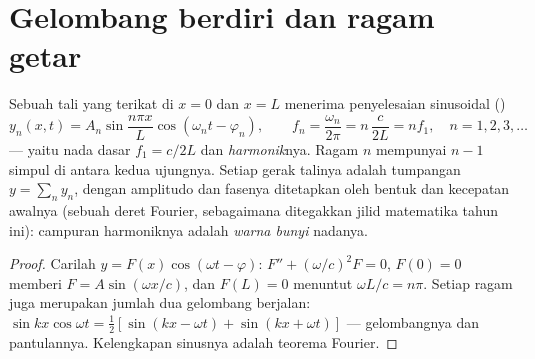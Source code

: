 \section{Gelombang berdiri dan ragam getar}

\begin{proposition}\label{prop:b2:waves-on-strings:modes}
Sebuah tali yang terikat di $x = 0$ dan $x = L$ menerima penyelesaian
 sinusoidal (\emph{})
\[
y_n(x, t) = A_n\sin\frac{n\pi x}{L}\cos(\omega_nt - \varphi_n) , \qquad
f_n = \frac{\omega_n}{2\pi} = n\,\frac{c}{2L} = n f_1 , \quad n = 1, 2, 3, \dots
\]
--- yaitu nada dasar $f_1 = c/2L$ dan \emph{harmonik}nya. Ragam $n$ mempunyai
$n - 1$ simpul di antara kedua ujungnya. Setiap gerak talinya adalah
tumpangan $y = \sum_ny_n$, dengan amplitudo dan fasenya ditetapkan oleh
bentuk dan kecepatan awalnya (sebuah deret Fourier, sebagaimana ditegakkan
jilid matematika tahun ini): campuran harmoniknya adalah
\emph{warna bunyi} nadanya.
\end{proposition}

\begin{proof}
Carilah $y = F(x)\cos(\omega t - \varphi)$: $F'' + (\omega/c)^2F = 0$, $F(0) = 0$ memberi
$F = A\sin(\omega x/c)$, dan $F(L) = 0$ menuntut $\omega L/c = n\pi$. Setiap ragam juga
merupakan jumlah dua gelombang berjalan: $\sin kx\cos\omega t = \tfrac12[\sin(kx -
\omega t) + \sin(kx + \omega t)]$ --- gelombangnya dan pantulannya.
Kelengkapan sinusnya adalah teorema Fourier.
\end{proof}

